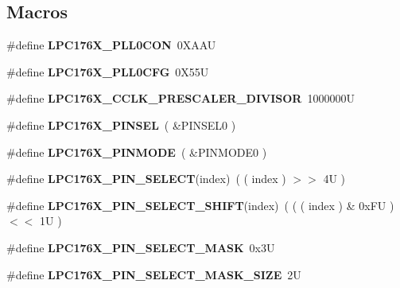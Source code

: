 \subsection*{Macros}
\begin{DoxyCompactItemize}
\item 
\mbox{\label{io-defs_8h_a803ef71914a443aa00dc4f0dd2c28b17}} 
\#define {\bfseries L\+P\+C176\+X\+\_\+\+P\+L\+L0\+C\+ON}~0\+X\+A\+AU
\item 
\mbox{\label{io-defs_8h_ab52183793b5707a13006631389b4a206}} 
\#define {\bfseries L\+P\+C176\+X\+\_\+\+P\+L\+L0\+C\+FG}~0\+X55U
\item 
\mbox{\label{io-defs_8h_aad0a671273cfd0a22b14409bebb0ce2e}} 
\#define {\bfseries L\+P\+C176\+X\+\_\+\+C\+C\+L\+K\+\_\+\+P\+R\+E\+S\+C\+A\+L\+E\+R\+\_\+\+D\+I\+V\+I\+S\+OR}~1000000U
\item 
\mbox{\label{io-defs_8h_a3786e1e52049c954a3f4e2495f2fcf69}} 
\#define {\bfseries L\+P\+C176\+X\+\_\+\+P\+I\+N\+S\+EL}~( \&P\+I\+N\+S\+E\+L0 )
\item 
\mbox{\label{io-defs_8h_a80b60629dc6819689f42ab463bd3f4d9}} 
\#define {\bfseries L\+P\+C176\+X\+\_\+\+P\+I\+N\+M\+O\+DE}~( \&P\+I\+N\+M\+O\+D\+E0 )
\item 
\mbox{\label{io-defs_8h_a77433bc1601af54d2feed37d1f3e8c9e}} 
\#define {\bfseries L\+P\+C176\+X\+\_\+\+P\+I\+N\+\_\+\+S\+E\+L\+E\+CT}(index)~( ( index ) $>$$>$ 4\+U )
\item 
\mbox{\label{io-defs_8h_a3ed77ccced38f727fbe5f71923d3cee5}} 
\#define {\bfseries L\+P\+C176\+X\+\_\+\+P\+I\+N\+\_\+\+S\+E\+L\+E\+C\+T\+\_\+\+S\+H\+I\+FT}(index)~( ( ( index ) \& 0x\+F\+U ) $<$$<$ 1\+U )
\item 
\mbox{\label{io-defs_8h_a76b37e5e4ff19eabc9ceac1ae26edb1e}} 
\#define {\bfseries L\+P\+C176\+X\+\_\+\+P\+I\+N\+\_\+\+S\+E\+L\+E\+C\+T\+\_\+\+M\+A\+SK}~0x3U
\item 
\mbox{\label{io-defs_8h_aaf7d9ef2216f238afbacfa2dfd8bcab1}} 
\#define {\bfseries L\+P\+C176\+X\+\_\+\+P\+I\+N\+\_\+\+S\+E\+L\+E\+C\+T\+\_\+\+M\+A\+S\+K\+\_\+\+S\+I\+ZE}~2U

\end{DoxyCompactItemize}
